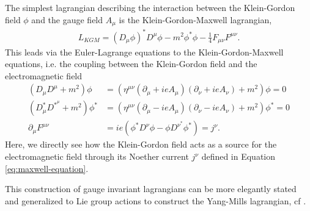 The simplest lagrangian describing the interaction between the Klein-Gordon field $\phi$ and the gauge field $A_\mu$ is the Klein-Gordon-Maxwell lagrangian,
\begin{align}
    L_{KGM} =  (D_\mu \phi)^* D^\mu \phi - m^2 \phi^* \phi - \frac{1}{4}F_{\mu\nu}F^{\mu\nu}.
\end{align}
This leads via the Euler-Lagrange equations to the Klein-Gordon-Maxwell equations, i.e. the coupling between the Klein-Gordon field and the electromagnetic field
\begin{subequations}
\begin{align}
    (D_\mu D^\mu + m^2)\phi &= (\eta^{\mu\nu}(\partial_\mu + ie A_\mu)(\partial_\nu + i e A_\nu) + m^2) \phi = 0 
    \label{eq:KG-equation}\\
    (D^*_\mu D^*^\mu + m^2)\phi^* &= (\eta^{\mu\nu}(\partial_\mu - ie A_\mu)(\partial_\nu - i e A_\nu) + m^2) \phi^* = 0 \\
    \partial_\mu F^{\mu \nu} &= ie (\phi^* D^\nu \phi - \phi D^\nu^* \phi^*) = j^\nu.
    \label{eq:maxwell-equation}
\end{align}
\end{subequations}
Here, we directly see how the Klein-Gordon field acts as a source for the electromagnetic field through its Noether current $j^\nu$ defined in Equation \eqref{eq:maxwell-equation}.

This construction of gauge invariant lagrangians can be more elegantly stated and generalized to Lie group actions to construct the Yang-Mills lagrangian, cf \cite{Hamilton:2017gbn}.